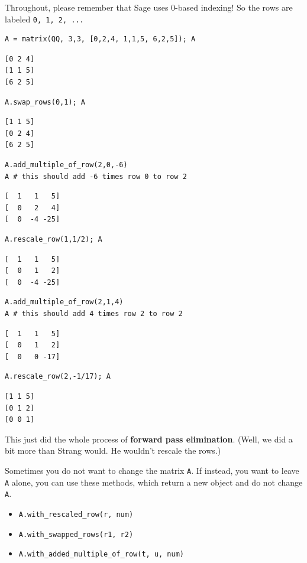 \documentclass[10pt,]{book}
\newcommand{\terminology}[1]{\textbf{#1}}
\theoremstyle{plain}
\theoremstyle{definition}
\numberwithin{equation}{section}
\begin{document}
        Throughout, please remember that Sage uses \(0\)-based indexing! So
        the rows are labeled \verb?0, 1, 2, ...?
\begin{lstlisting}[style=sageinput]
A = matrix(QQ, 3,3, [0,2,4, 1,1,5, 6,2,5]); A
\end{lstlisting}
\begin{lstlisting}[style=sageoutput]
[0 2 4]
[1 1 5]
[6 2 5]
\end{lstlisting}
\begin{lstlisting}[style=sageinput]
A.swap_rows(0,1); A
\end{lstlisting}
\begin{lstlisting}[style=sageoutput]
[1 1 5]
[0 2 4]
[6 2 5]
\end{lstlisting}
\begin{lstlisting}[style=sageinput]
A.add_multiple_of_row(2,0,-6)
A # this should add -6 times row 0 to row 2
\end{lstlisting}
\begin{lstlisting}[style=sageoutput]
[  1   1   5]
[  0   2   4]
[  0  -4 -25]
\end{lstlisting}
\begin{lstlisting}[style=sageinput]
A.rescale_row(1,1/2); A
\end{lstlisting}
\begin{lstlisting}[style=sageoutput]
[  1   1   5]
[  0   1   2]
[  0  -4 -25]
\end{lstlisting}
\begin{lstlisting}[style=sageinput]
A.add_multiple_of_row(2,1,4)
A # this should add 4 times row 2 to row 2
\end{lstlisting}
\begin{lstlisting}[style=sageoutput]
[  1   1   5]
[  0   1   2]
[  0   0 -17]
\end{lstlisting}
\begin{lstlisting}[style=sageinput]
A.rescale_row(2,-1/17); A
\end{lstlisting}
\begin{lstlisting}[style=sageoutput]
[1 1 5]
[0 1 2]
[0 0 1]
\end{lstlisting}
\par

        This just did the whole process of \terminology{forward pass elimination}.
        (Well, we did a bit more than Strang would. He wouldn't rescale the rows.)
\par

        Sometimes you do not want to change the matrix \verb?A?. If instead, you
        want to leave \verb?A? alone, you can use these methods, which return
        a new object and do not change \verb?A?.
\begin{itemize}
\item{}\verb?A.with_rescaled_row(r, num)?\item{}\verb?A.with_swapped_rows(r1, r2)?\item{}\verb?A.with_added_multiple_of_row(t, u, num)?\end{itemize}
\par
\end{document}
